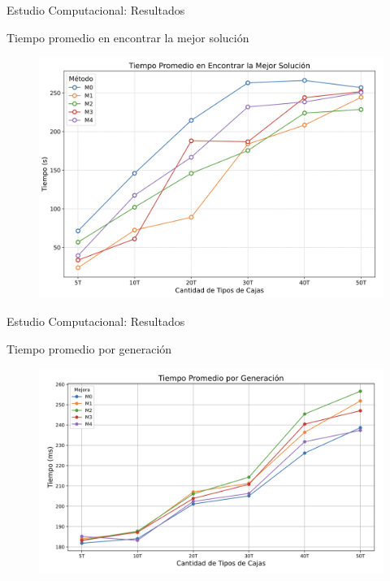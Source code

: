 \documentclass[handout]{beamer}
\begin{document}
\begin{frame}{Estudio Computacional: Resultados}
    \begin{exampleblock}{Tiempo promedio en encontrar la mejor solución}
        \begin{figure}
            \centering
            \includegraphics[width=0.8\linewidth]{pic/exp-tiempo-mejor-solucion.png}
            \label{fig:tiempo-mejor-solucion}
        \end{figure}
    \end{exampleblock}
\end{frame}

\begin{frame}{Estudio Computacional: Resultados}
    \begin{exampleblock}{Tiempo promedio por generación}
        \begin{figure}
            \centering
            \includegraphics[width=0.8\linewidth]{pic/exp-tiempo-por-generacion.png}
        \end{figure}
    \end{exampleblock}
\end{frame}
\end{document}
